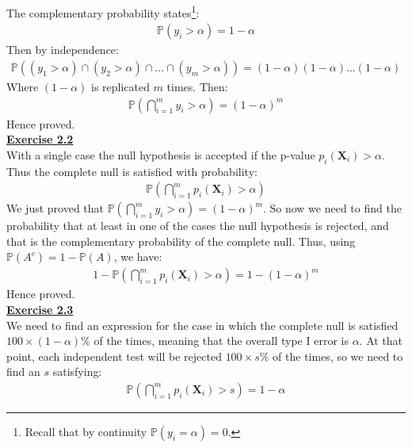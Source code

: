 \documentclass[a4paper, 11pt]{article}
\begin{document}
The complementary probability states\footnote{Recall that by continuity $\mathbb{P}(y_i = \alpha) = 0$.}:
\begin{eqnarray}
\mathbb{P}(y_i > \alpha) = 1 - \alpha \nonumber
\end{eqnarray}
Then by independence:
\begin{eqnarray}
\mathbb{P}((y_1 > \alpha) \cap (y_2 > \alpha) \cap \dots \cap (y_m > \alpha)) = (1 -\alpha)(1 -\alpha) \dots (1 -\alpha) \nonumber
\end{eqnarray}
Where $(1 -\alpha)$ is replicated $m$ times. Then:
\begin{eqnarray}
\mathbb{P} \left(\bigcap_{i=1}^{m} y_i > \alpha \right) = (1-\alpha)^m \nonumber
\end{eqnarray}
Hence proved.\\
\newline \textbf{\underline{Exercise 2.2}}\\
\newline With a single case the null hypothesis is accepted if the p-value $p_i(\mathbf{X}_i) > \alpha$. Thus the complete null is satisfied with probability:
\begin{eqnarray}
\mathbb{P} \left( \bigcap_{i=1}^{m} p_i(\mathbf{X}_i) > \alpha \right) \nonumber
\end{eqnarray}
We just proved that $\mathbb{P} \left(\bigcap_{i=1}^{m} y_i > \alpha \right) = (1-\alpha)^m$. So now we need to find the probability that at least in one of the cases the null hypothesis is rejected, and that is the complementary probability of the complete null. Thus, using $\mathbb{P}(A^c) = 1 - \mathbb{P}(A)$, we have:
\begin{eqnarray}
1 - \mathbb{P} \left(\bigcap_{i=1}^{m} p_i(\mathbf{X}_i) > \alpha \right) = 1 - (1-\alpha)^m \nonumber
\end{eqnarray}
Hence proved.\\
\newline \textbf{\underline{Exercise 2.3}}\\
\newline We need to find an expression for the case in which the complete null is satisfied $100 \times(1 - \alpha)$\% of the times, meaning that the overall type I error is $\alpha$. At that point, each independent test will be rejected $100 \times s$\% of the times, so we need to find an $s$ satisfying:
\begin{eqnarray}
\mathbb{P} \left( \bigcap_{i=1}^{m} p_i(\mathbf{X}_i) > s \right) = 1 - \alpha \nonumber
\end{eqnarray}
\end{document}
